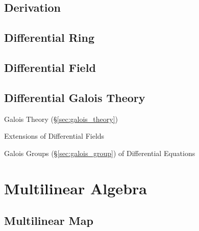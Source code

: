 \subsection{Derivation}\label{sec:derivation}

\subsection{Differential Ring}\label{sec:differential_ring}

\subsection{Differential Field}\label{sec:differential_field}

\subsection{Differential Galois Theory}\label{sec:differential_galois}

Galois Theory (\S\ref{sec:galois_theory})

Extensions of Differential Fields

Galois Groups (\S\ref{sec:galois_group}) of Differential Equations



\section{Multilinear Algebra}\label{sec:multilinear_algebra}

\subsection{Multilinear Map}\label{sec:multilinear_map}

